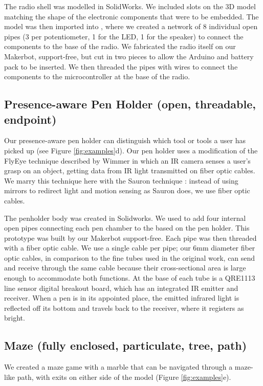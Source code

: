 The radio shell was modelled in SolidWorks. We included slots on the 3D model matching the shape of the electronic components that were to be embedded. The model was then imported into \systemnamenospace, where we created a network of 8 individual open pipes (3 per potentiometer, 1 for the LED, 1 for the speaker) to connect the components to the base of the radio. We fabricated the radio itself on our Makerbot, support-free, but cut in two pieces to allow the Arduino and battery pack to be inserted. We then threaded the pipes with wires to connect the components to the microcontroller at the base of the radio. 

\subsection{Presence-aware Pen Holder (open, threadable, endpoint)}
Our presence-aware pen holder can distinguish which tool or tools a user has picked up (see Figure \ref{fig:examples}d).  Our pen holder uses a modification of the FlyEye technique described by Wimmer \cite{Wimmer-flyeye} in which an IR camera senses a user's grasp on an object, getting data from IR light transmitted on fiber optic cables.  We marry this technique here with the Sauron technique \cite{Savage-sauron}: instead of using mirrors to redirect light and motion sensing as Sauron does, we use fiber optic cables.

The penholder body was created in Solidworks. We used \systemname to add four internal open pipes connecting each pen chamber to the based on the pen holder. This prototype was built by our Makerbot support-free.  Each pipe was then threaded with a fiber optic cable.  We use a single cable per pipe; our 6mm diameter fiber optic cables, in comparison to the fine tubes used in the original work, can send and receive through the same cable because their cross-sectional area is large enough to accommodate both functions. At the base of each tube is a QRE1113 line sensor digital breakout board, which has an integrated IR emitter and receiver.   When a pen is in its appointed place, the emitted infrared light is reflected off its bottom and travels back to the receiver, where it registers as bright.  

\subsection{Maze (fully enclosed, particulate, tree, path)}

We created a maze game with a marble that can be navigated through a maze-like path, with exits on either side of the model (Figure \ref{fig:examples}e). 

